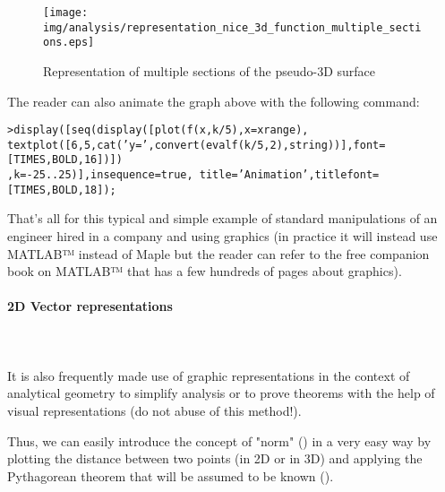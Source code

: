 	\begin{figure}[H]
	\centering
	\texttt{[image: img/analysis/representation\_nice\_3d\_function\_multiple\_sections.eps]}
	\vspace*{3mm}
	\caption{Representation of multiple sections of the pseudo-3D surface}
	\end{figure}
	
	The reader can also animate the graph above with the following command:
	
	\texttt{>display([seq(display([plot(f(x,k/5),x=xrange),}\\ \texttt{textplot([6,5,cat('y=',convert(evalf(k/5,2),string))],font=[TIMES,BOLD,16])])}\\
	\texttt{,k=-25..25)],insequence=true, title='Animation',titlefont=[TIMES,BOLD,18]);}
	
	That's all for this typical and simple example of standard manipulations of an engineer hired in a company and using graphics (in practice it will instead use MATLAB™ instead of Maple but the reader can refer to the free companion book on MATLAB™ that has a few hundreds of pages about graphics).
	
	\paragraph{2D Vector representations}\mbox{}\\\\
	It is also frequently made use of graphic representations in the context of analytical geometry to simplify analysis or to prove theorems with the help of visual representations (do not abuse of this method!).
	
	Thus, we can easily introduce the concept of "norm" () in a very easy way by plotting the distance between two points (in 2D or in 3D) and applying the Pythagorean theorem that will be assumed to be known ().
	
